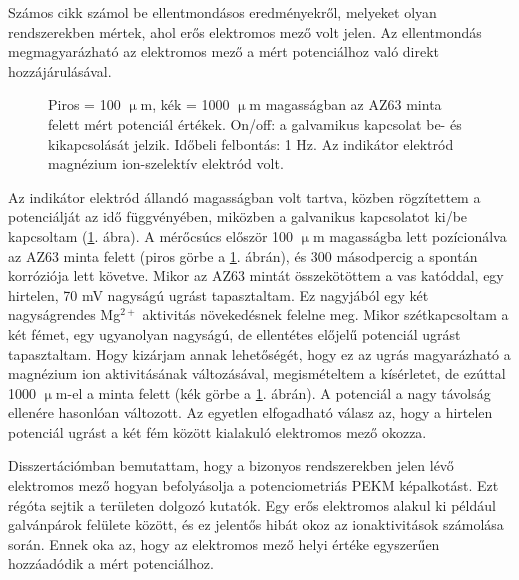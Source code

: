 Számos cikk számol be ellentmondásos eredményekről, melyeket olyan rendszerekben mértek, ahol erős elektromos mező volt jelen.
Az ellentmondás megmagyarázható az elektromos mező a mért potenciálhoz való direkt hozzájárulásával.

\begin{figure}
\centering
{}
\caption{Piros = 100 $\upmu$m, kék = 1000 $\upmu$m magasságban az AZ63 minta felett mért potenciál értékek. On/off: a galvamikus kapcsolat be- és kikapcsolását jelzik. Időbeli felbontás: 1 Hz. Az indikátor elektród magnézium ion-szelektív elektród volt.}
\label{fig:approach}
\end{figure}

Az indikátor elektród állandó magasságban volt tartva, közben rögzítettem a potenciálját az idő függvényében, miközben a galvanikus kapcsolatot ki/be kapcsoltam (\ref{fig:approach}. ábra).
A mérőcsúcs először 100 $\upmu$m magasságba lett pozícionálva az AZ63 minta felett (piros görbe a \ref{fig:approach}. ábrán), és 300 másodpercig a spontán korróziója lett követve.
Mikor az AZ63 mintát összekötöttem a vas katóddal, egy hirtelen, 70 mV nagyságú ugrást tapasztaltam.
Ez nagyjából egy két nagyságrendes Mg$^{2+}$ aktivitás növekedésnek felelne meg.
Mikor szétkapcsoltam a két fémet, egy ugyanolyan nagyságú, de ellentétes előjelű potenciál ugrást tapasztaltam.
Hogy kizárjam annak lehetőségét, hogy ez az ugrás magyarázható a magnézium ion aktivitásának változásával, megismételtem a kísérletet, de ezúttal 1000 $\upmu$m-el a minta felett (kék görbe a \ref{fig:approach}. ábrán).
A potenciál a nagy távolság ellenére hasonlóan változott.
Az egyetlen elfogadható válasz az, hogy a hirtelen potenciál ugrást a két fém között kialakuló elektromos mező okozza.

Disszertációmban bemutattam, hogy a bizonyos rendszerekben jelen lévő elektromos mező hogyan befolyásolja a potenciometriás PEKM képalkotást.
Ezt régóta sejtik a területen dolgozó kutatók.
Egy erős elektromos alakul ki például galvánpárok felülete között, és ez jelentős hibát okoz az ionaktivitások számolása során.
Ennek oka az, hogy az elektromos mező helyi értéke egyszerűen hozzáadódik a mért potenciálhoz.

